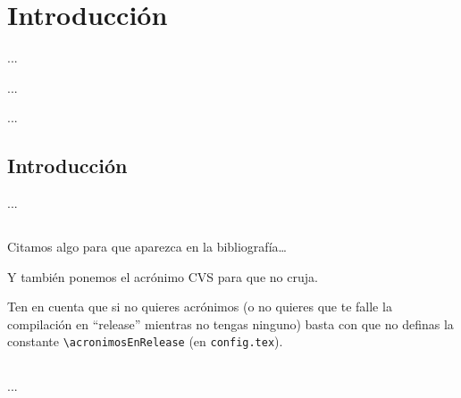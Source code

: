 %
%

\chapter{Introducción}

\begin{FraseCelebre}
\begin{Frase}
...
\end{Frase}
\begin{Fuente}
...
\end{Fuente}
\end{FraseCelebre}

\begin{resumen}
...
\end{resumen}


\section{Introducción}
\label{cap1:sec:introduccion}

...

\section*{\NotasBibliograficas}
\TocNotasBibliograficas

Citamos algo para que aparezca en la bibliografía\ldots
\citep{ldesc2e}

\medskip

Y también ponemos el acrónimo \ac{CVS} para que no cruja.

Ten en cuenta que si no quieres acrónimos (o no quieres que te falle la compilación en ``release'' mientras no tengas ninguno) basta con que no definas la constante \verb+\acronimosEnRelease+ (en \texttt{config.tex}).


\section*{\ProximoCapitulo}
\TocProximoCapitulo

...

